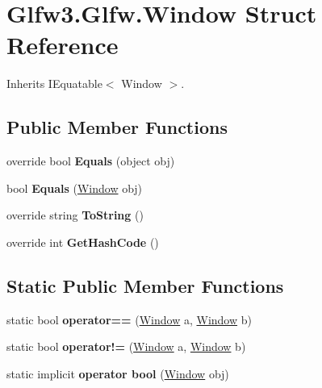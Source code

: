 \hypertarget{struct_glfw3_1_1_glfw_1_1_window}{}\section{Glfw3.\+Glfw.\+Window Struct Reference}
\label{struct_glfw3_1_1_glfw_1_1_window}


 




Inherits I\+Equatable$<$ Window $>$.

\subsection*{Public Member Functions}
\begin{DoxyCompactItemize}
\item 
\mbox{\label{struct_glfw3_1_1_glfw_1_1_window_ac6225df55c6be89fe7d865e7e5ad2432}} 
override bool {\bfseries Equals} (object obj)
\item 
\mbox{\label{struct_glfw3_1_1_glfw_1_1_window_ab371b7c6f2adc28989037043d88c1022}} 
bool {\bfseries Equals} (\mbox{\hyperlink{struct_glfw3_1_1_glfw_1_1_window}{Window}} obj)
\item 
\mbox{\label{struct_glfw3_1_1_glfw_1_1_window_a1563cbfd0561f8ba064f56c686ecf527}} 
override string {\bfseries To\+String} ()
\item 
\mbox{\label{struct_glfw3_1_1_glfw_1_1_window_a1c798779084be194779ca2162aea8450}} 
override int {\bfseries Get\+Hash\+Code} ()
\end{DoxyCompactItemize}
\subsection*{Static Public Member Functions}
\begin{DoxyCompactItemize}
\item 
\mbox{\label{struct_glfw3_1_1_glfw_1_1_window_aa52188804106c3fcf29602ea3e7c2b44}} 
static bool {\bfseries operator==} (\mbox{\hyperlink{struct_glfw3_1_1_glfw_1_1_window}{Window}} a, \mbox{\hyperlink{struct_glfw3_1_1_glfw_1_1_window}{Window}} b)
\item 
\mbox{\label{struct_glfw3_1_1_glfw_1_1_window_aa404667211594e340b28f9f1dec3b894}} 
static bool {\bfseries operator!=} (\mbox{\hyperlink{struct_glfw3_1_1_glfw_1_1_window}{Window}} a, \mbox{\hyperlink{struct_glfw3_1_1_glfw_1_1_window}{Window}} b)
\item 
\mbox{\label{struct_glfw3_1_1_glfw_1_1_window_a5f2feaf18e8bc600e4c60aae0a65ef70}} 
static implicit {\bfseries operator bool} (\mbox{\hyperlink{struct_glfw3_1_1_glfw_1_1_window}{Window}} obj)
\end{DoxyCompactItemize}
